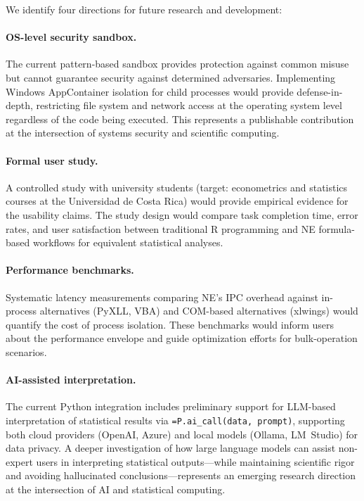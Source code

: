 \documentclass[preprint,12pt,authoryear]{elsarticle}
\newcommand{\neven}{NE\raisebox{0.2ex}{v}\rotatebox[origin=c]{180}{E}\rotatebox[origin=c]{180}{N}}
\begin{document}
We identify four directions for future research and development:

\paragraph{OS-level security sandbox.} The current pattern-based sandbox provides protection against common misuse but cannot guarantee security against determined adversaries. Implementing Windows AppContainer isolation for child processes would provide defense-in-depth, restricting file system and network access at the operating system level regardless of the code being executed. This represents a publishable contribution at the intersection of systems security and scientific computing.

\paragraph{Formal user study.} A controlled study with university students (target: econometrics and statistics courses at the Universidad de Costa Rica) would provide empirical evidence for the usability claims. The study design would compare task completion time, error rates, and user satisfaction between traditional R programming and \neven{} formula-based workflows for equivalent statistical analyses.

\paragraph{Performance benchmarks.} Systematic latency measurements comparing \neven{}'s IPC overhead against in-process alternatives (PyXLL, VBA) and COM-based alternatives (xlwings) would quantify the cost of process isolation. These benchmarks would inform users about the performance envelope and guide optimization efforts for bulk-operation scenarios.

\paragraph{AI-assisted interpretation.} The current Python integration includes preliminary support for LLM-based interpretation of statistical results via \texttt{=P.ai\_call(data, prompt)}, supporting both cloud providers (OpenAI, Azure) and local models (Ollama, LM~Studio) for data privacy. A deeper investigation of how large language models can assist non-expert users in interpreting statistical outputs---while maintaining scientific rigor and avoiding hallucinated conclusions---represents an emerging research direction at the intersection of AI and statistical computing.
\end{document}

